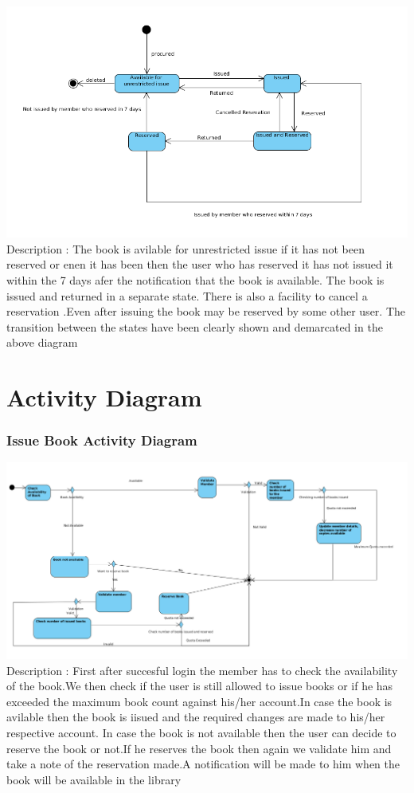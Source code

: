 \documentclass{article}
\begin{document}
\includegraphics[scale=0.50]{images/stateDiagIssue.png}
\\
Description : The book is avilable for unrestricted issue if it has not been reserved or enen it has been then the user who has reserved it has not issued it within the 7 days afer the notification that the book is available. The book is issued and returned in a separate state. There is also a facility to cancel a reservation .Even after issuing the book may be reserved by some other user. The transition between the states have been clearly shown and demarcated in the above diagram

\section{Activity Diagram}
\subsubsection*{Issue Book Activity Diagram}
\includegraphics[scale=0.50]{images/activityDiagIssue.png}
\\
Description : First after succesful login the member has to check the availability of the book.We then check if the user is still allowed to issue books or if he has exceeded the maximum book count against his/her account.In case the book is avilable then the book is iisued and the required changes are made to his/her respective account. In case the book is not available then the user can decide to reserve the book or not.If he reserves the book then again we validate him and take a note of the reservation made.A notification will be made to him when the book will be available in the library
\end{document}
